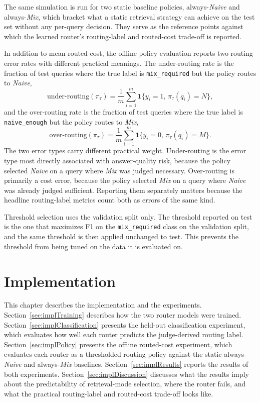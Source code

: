 \documentclass[english, bibtex]{kththesis}               %
\numberwithin{listing}{chapter}
\begin{document}
The same simulation is run for two static baseline policies, always-\emph{Naive} and always-\emph{Mix}, which bracket what a static retrieval strategy can achieve on the test set without any per-query decision. They serve as the reference points against which the learned router's routing-label and routed-cost trade-off is reported.

In addition to mean routed cost, the offline policy evaluation reports two routing error rates with different practical meanings. The under-routing rate is the fraction of test queries where the true label is \texttt{mix\_required} but the policy routes to \emph{Naive},
\begin{equation}
\label{eq:underRouting}
\mathrm{under\text{-}routing}(\pi_\tau)
=
\frac{1}{m}
\sum_{i=1}^{m}
\mathbf{1}\{y_i = 1,\, \pi_\tau(q_i) = N\},
\end{equation}
and the over-routing rate is the fraction of test queries where the true label is \texttt{naive\_enough} but the policy routes to \emph{Mix},
\begin{equation}
\label{eq:overRouting}
\mathrm{over\text{-}routing}(\pi_\tau)
=
\frac{1}{m}
\sum_{i=1}^{m}
\mathbf{1}\{y_i = 0,\, \pi_\tau(q_i) = M\}.
\end{equation}
The two error types carry different practical weight. Under-routing is the error type most directly associated with answer-quality risk, because the policy selected \emph{Naive} on a query where \emph{Mix} was judged necessary. Over-routing is primarily a cost error, because the policy selected \emph{Mix} on a query where \emph{Naive} was already judged sufficient. Reporting them separately matters because the headline routing-label metrics count both as errors of the same kind.

Threshold selection uses the validation split only. The threshold reported on test is the one that maximizes F1 on the \texttt{mix\_required} class on the validation split, and the same threshold is then applied unchanged to test. This prevents the threshold from being tuned on the data it is evaluated on.

\cleardoublepage
\chapter{Implementation}
\label{ch:implementation}

This chapter describes the implementation and the experiments. Section~\ref{sec:implTraining} describes how the two router models were trained. Section~\ref{sec:implClassification} presents the held-out classification experiment, which evaluates how well each router predicts the judge-derived routing label. Section~\ref{sec:implPolicy} presents the offline routed-cost experiment, which evaluates each router as a thresholded routing policy against the static always-\emph{Naive} and always-\emph{Mix} baselines. Section~\ref{sec:implResults} reports the results of both experiments. Section~\ref{sec:implDiscussion} discusses what the results imply about the predictability of retrieval-mode selection, where the router fails, and what the practical routing-label and routed-cost trade-off looks like.
\end{document}
